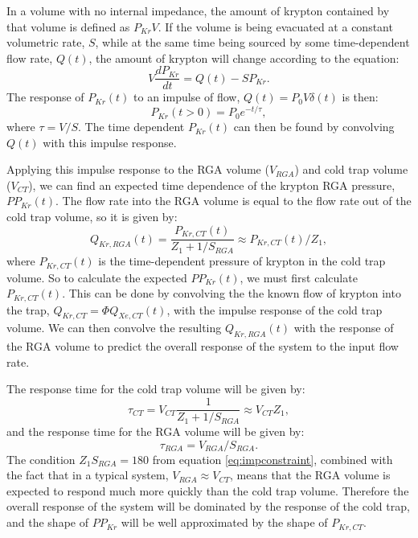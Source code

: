 In a volume with no internal impedance, the amount of krypton contained by that volume is defined as $P_{Kr}V$. If the volume is being evacuated at a constant volumetric rate, $S$, while at the same time being sourced by some time-dependent flow rate, $Q(t)$, the amount of krypton will change according to the equation:
\begin{equation}
\label{eq:expdiff}
V\frac{dP_{Kr}}{dt}=Q(t)-SP_{Kr}.
\end{equation}
The response of $P_{Kr}(t)$ to an impulse of flow, $Q(t)=P_0V\delta(t)$ is then:
\begin{equation}
P_{Kr}(t>0)=P_0e^{-t/\tau},
\end{equation}
where $\tau = V/S$. The time dependent $P_{Kr}(t)$ can then be found by convolving $Q(t)$ with this impulse response.

Applying this impulse response to the RGA volume ($V_{RGA}$) and cold trap volume ($V_{CT}$), we can find an expected time dependence of the krypton RGA pressure, $PP_{Kr}(t)$. The flow rate into the RGA volume is equal to the flow rate out of the cold trap volume, so it is given by:
\begin{equation}
Q_{Kr,RGA}(t)=\frac{P_{Kr,CT}(t)}{Z_1+1/S_{RGA}}\approx P_{Kr,CT}(t)/Z_1,
\end{equation}
where $P_{Kr,CT}(t)$ is the time-dependent pressure of krypton in the cold trap volume. So to calculate the expected $PP_{Kr}(t)$, we must first calculate $P_{Kr,CT}(t)$. This can be done by convolving the the known flow of krypton into the trap, $Q_{Kr,CT}=\Phi Q_{Xe,CT}(t)$, with the impulse response of the cold trap volume. We can then convolve the resulting $Q_{Kr,RGA}(t)$ with the response of the RGA volume to predict the overall response of the system to the input flow rate. 

The response time for the cold trap volume will be given by:
\begin{equation}
\tau_{CT}=V_{CT}\frac{1}{Z_1+1/S_{RGA}} \approx V_{CT}Z_1,
\label{eq:CTtime}
\end{equation}
and the response time for the RGA volume will be given by:
\begin{equation}
\tau_{RGA}=V_{RGA}/S_{RGA}.
\end{equation}
The condition $Z_1S_{RGA}=180$ from equation \ref{eq:impconstraint}, combined with the fact that in a typical system, $V_{RGA}\approx V_{CT}$, means that the RGA volume is expected to respond much more quickly than the cold trap volume. Therefore the overall response of the system will be dominated by the response of the cold trap, and the shape of $PP_{Kr}$ will be well approximated by the shape of $P_{Kr,CT}$.

